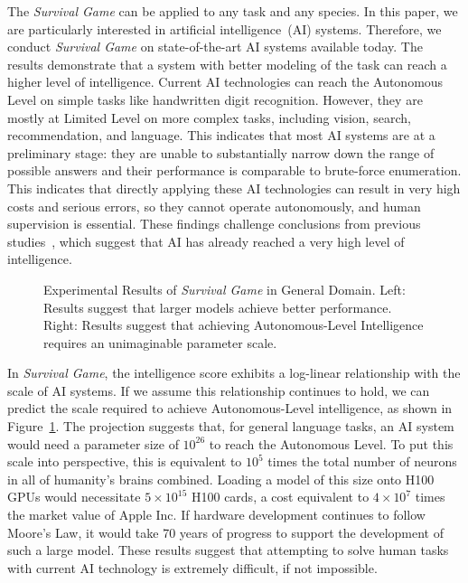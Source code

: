 The \textit{Survival Game} can be applied to any task and any species. In this paper, we are particularly interested in artificial intelligence~(AI) systems. Therefore, we conduct \textit{Survival Game} on state-of-the-art AI systems available today. The results demonstrate that a system with better modeling of the task can reach a higher level of intelligence. Current AI technologies can reach the Autonomous Level on simple tasks like handwritten digit recognition. However, they are mostly at Limited Level on more complex tasks, including vision, search, recommendation, and language. This indicates that most AI systems are at a preliminary stage: they are unable to substantially narrow down the range of possible answers and their performance is comparable to brute-force enumeration. This indicates that directly applying these AI technologies can result in very high costs and serious errors, so they cannot operate autonomously, and human supervision is essential. 
These findings challenge conclusions from previous studies~\citep{biever2023chatgpt, aharoni2024attributions, mei2024turing}, which suggest that AI has already reached a very high level of intelligence.

\begin{figure}[h]
    \subcapraggedrighttrue
    \subcaphangtrue
        \centering
         \hfill
        \caption{Experimental Results of \textit{Survival Game} in General Domain. Left: Results suggest that larger models achieve better performance.
         Right: Results suggest that achieving Autonomous-Level Intelligence requires an unimaginable parameter scale.}
        \label{fig:full_perf}
    \end{figure}

In \textit{Survival Game}, the intelligence score exhibits a log-linear relationship with the scale of AI systems. If we assume this relationship continues to hold, we can predict the scale required to achieve Autonomous-Level intelligence, as shown in Figure~\ref{fig:full_perf}. The projection suggests that, for general language tasks, an AI system would need a parameter size of $10^{26}$ to reach the Autonomous Level.
To put this scale into perspective, this is equivalent to $10^5$ times the total number of neurons in all of humanity’s brains combined. Loading a model of this size onto H100 GPUs would necessitate $5 \times 10^{15}$ H100 cards, a cost equivalent to $4 \times 10^7$ times the market value of Apple Inc. If hardware development continues to follow Moore's Law, it would take 70 years of progress to support the development of such a large model.
These results suggest that attempting to solve human tasks with current AI technology is extremely difficult, if not impossible.


